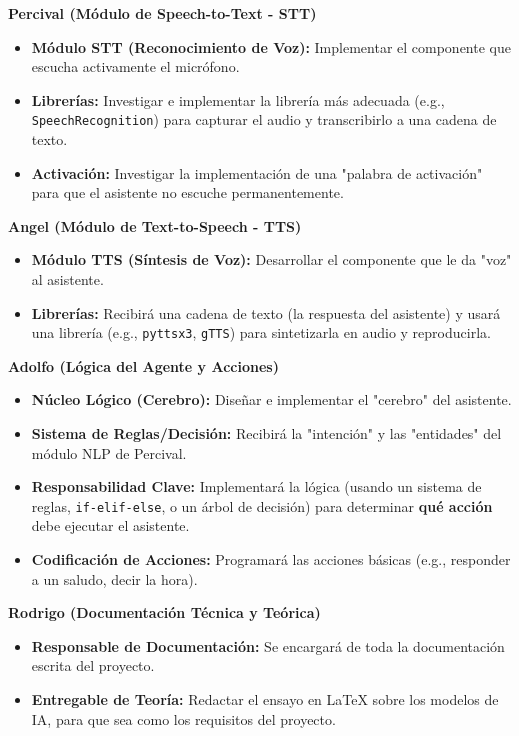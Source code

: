 \documentclass[a4paper,12pt]{article}
\begin{document}
\textbf{Percival (Módulo de Speech-to-Text - STT)}
\begin{itemize}
    \item \textbf{Módulo STT (Reconocimiento de Voz):} Implementar el componente que escucha activamente el micrófono.
    \item \textbf{Librerías:} Investigar e implementar la librería más adecuada (e.g., \texttt{SpeechRecognition}) para capturar el audio y transcribirlo a una cadena de texto.
    \item \textbf{Activación:} Investigar la implementación de una "palabra de activación" para que el asistente no escuche permanentemente.
\end{itemize}

\textbf{Angel (Módulo de Text-to-Speech - TTS)}
\begin{itemize}
    \item \textbf{Módulo TTS (Síntesis de Voz):} Desarrollar el componente que le da "voz" al asistente.
    \item \textbf{Librerías:} Recibirá una cadena de texto (la respuesta del asistente) y usará una librería (e.g., \texttt{pyttsx3}, \texttt{gTTS}) para sintetizarla en audio y reproducirla.
\end{itemize}

\textbf{Adolfo (Lógica del Agente y Acciones)}
\begin{itemize}
    \item \textbf{Núcleo Lógico (Cerebro):} Diseñar e implementar el "cerebro" del asistente.
    \item \textbf{Sistema de Reglas/Decisión:} Recibirá la "intención" y las "entidades" del módulo NLP de Percival.
    \item \textbf{Responsabilidad Clave:} Implementará la lógica (usando un sistema de reglas, \texttt{if-elif-else}, o un árbol de decisión) para determinar \textbf{qué acción} debe ejecutar el asistente.
    \item \textbf{Codificación de Acciones:} Programará las acciones básicas (e.g., responder a un saludo, decir la hora).
\end{itemize}

\textbf{Rodrigo (Documentación Técnica y Teórica)}
\begin{itemize}
    \item \textbf{Responsable de Documentación:} Se encargará de toda la documentación escrita del proyecto.
    \item \textbf{Entregable de Teoría:} Redactar el ensayo en LaTeX sobre los modelos de IA, para que sea como los requisitos del proyecto.

\end{itemize}
\end{document}
